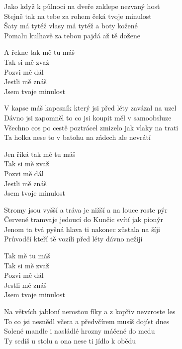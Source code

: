 \begin{text}
\hfill\break
\hfill\break
Jako když k půlnoci na dveře zaklepe nezvaný host\\
Stejně tak na tebe za rohem čeká tvoje minulost \\
Šaty má tytéž vlasy má tytéž a boty kožené\\
Pomalu kulhavě za tebou pajdá až tě dožene

\vin A řekne tak mě tu máš \\
\vin Tak si mě zvaž\\
\vin Pozvi mě dál \\
\vin Jestli mě znáš\\
\vin Jsem tvoje minulost

V kapse máš kapesník který jsi před léty zavázal na uzel\\
Dávno jsi zapomněl to co jsi koupit měl v samoobsluze\\
Všechno cos po cestě poztrácel zmizelo jak vlaky na trati\\
Ta holka nese to v batohu na zádech ale nevrátí

\vin Jen říká tak mě tu máš \\
\vin Tak si mě zvaž\\
\vin Pozvi mě dál \\
\vin Jestli mě znáš\\
\vin Jsem tvoje minulost

Stromy jsou vyšší a tráva je nižší a na louce roste pýr\\
Červené tramvaje jedoucí do Kunčic svítí jak pionýr\\
Jenom ta tvá pyšná hlava ti nakonec zůstala na šíji\\
Průvodčí kteří tě vozili před léty dávno nežijí

\vin Tak mě tu máš \\
\vin Tak si mě zvaž\\
\vin Pozvi mě dál \\
\vin Jestli mě znáš\\
\vin Jsem tvoje minulost

Na větvích jabloní nerostou fíky a z kopřiv nevzroste les\\
To co jsi nesnědl včera a předvčírem musíš dojíst dnes\\
Solené mandle i nasládlé hrozny máčené do medu\\
Ty sedíš u stolu a ona nese ti jídlo k obědu


\end{text}
